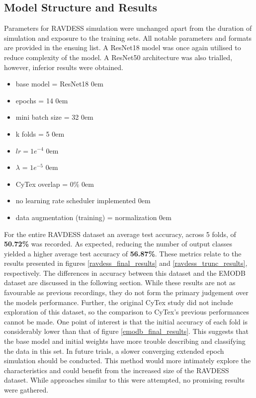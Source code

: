 \subsection{Model Structure and Results}
Parameters for RAVDESS simulation were unchanged apart from the duration of simulation and exposure to the training sets. All notable parameters and formats are provided in the ensuing list. A ResNet18 model was once again utilised to reduce complexity of the model. A ResNet50 architecture was also trialled, however, inferior results were obtained.
\begin{itemize}
    \item base model = ResNet18
    \itemsep0em
    \item epochs = 14
    \itemsep0em
    \item mini batch size = 32
    \itemsep0em
    \item k folds = 5
    \itemsep0em
    \item $lr = 1e^{-4}$
    \itemsep0em
    \item $\lambda$ = $1e^{-5}$
    \itemsep0em
    \item CyTex overlap = $0\%$
    \itemsep0em
    \item no learning rate scheduler implemented
    \itemsep0em
    \item data augmentation (training) = normalization
    \itemsep0em
\end{itemize}
For the entire RAVDESS dataset an average test accuracy, across 5 folds, of \textbf{50.72\%} was recorded. As expected, reducing the number of output classes yielded a higher average test accuracy of \textbf{56.87\%}. These metrics relate to the results presented in figures \ref{ravdess_final_results} and \ref{ravdess_trunc_results}, respectively. The differences in accuracy between this dataset and the EMODB dataset are discussed in the following section. While these results are not as favourable as previous recordings, they do not form the primary judgement over the models performance. Further, the original CyTex study did not include exploration of this dataset, so the comparison to CyTex's previous performances cannot be made. One point of interest is that the initial accuracy of each fold is considerably lower than that of figure \ref{emodb_final_results}. This suggests that the base model and initial weights have more trouble describing and classifying the data in this set. In future trials, a slower converging extended epoch simulation should be conducted. This method would more intimately explore the characteristics and could benefit from the increased size of the RAVDESS dataset. While approaches similar to this were attempted, no promising results were gathered.
